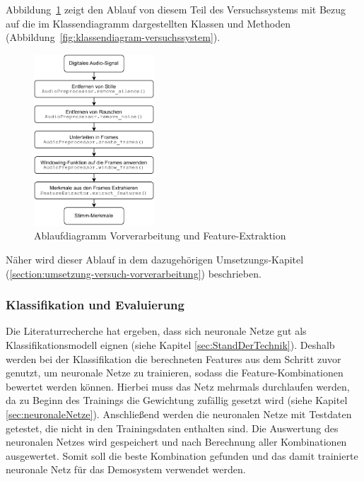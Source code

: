 Abbildung~\ref{fig:ablaufdiagramm-preprocessing-extraction} zeigt den Ablauf von diesem Teil des Versuchssystems mit Bezug auf die im Klassendiagramm dargestellten Klassen und Methoden (Abbildung~\ref{fig:klassendiagram-versuchssystem}).

\begin{figure}[H]
    \centering
    \includegraphics[width=0.4\textwidth, keepaspectratio]{images/ablaufdiagramm-preprocessing-extraction.pdf}
    \caption{Ablaufdiagramm Vorverarbeitung und Feature-Extraktion}
    \label{fig:ablaufdiagramm-preprocessing-extraction}
\end{figure}\noindent

Näher wird dieser Ablauf in dem dazugehörigen Umsetzungs-Kapitel (\ref{section:umsetzung-versuch-vorverarbeitung}) beschrieben.

\subsubsection{Klassifikation und Evaluierung}\label{sec:KonzeptKlassifikation}

Die Literaturrecherche hat ergeben, dass sich neuronale Netze gut als Klassifikationsmodell eignen (siehe Kapitel \ref{sec:StandDerTechnik}). 
Deshalb werden bei der Klassifikation die berechneten Features aus dem Schritt zuvor genutzt, um neuronale Netze zu trainieren, sodass die Feature-Kombinationen bewertet werden können.
Hierbei muss das Netz mehrmals durchlaufen werden, da zu Beginn des Trainings die Gewichtung zufällig gesetzt wird (siehe Kapitel \ref{sec:neuronaleNetze}).
Anschließend werden die neuronalen Netze mit Testdaten getestet, die nicht in den Trainingsdaten enthalten sind.
Die Auswertung des neuronalen Netzes wird gespeichert und nach Berechnung aller Kombinationen ausgewertet.
Somit soll die beste Kombination gefunden und das damit trainierte neuronale Netz für das Demosystem verwendet werden.

